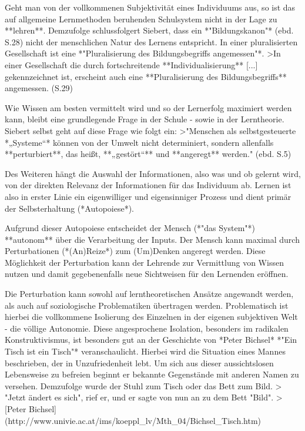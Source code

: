Geht man von der vollkommenen Subjektivität eines Individuums aus, so ist das auf allgemeine Lernmethoden beruhenden Schulsystem nicht in der Lage zu **lehren**.
Demzufolge schlussfolgert Siebert, dass ein *"Bildungskanon"* (ebd. S.28) nicht der menschlichen Natur des Lernens entspricht.
In einer pluralisierten Gesellschaft ist eine *"Pluralisierung des Bildungsbegriffs angemessen"*.
>In einer Gesellschaft die durch fortschreitende **Individualisierung** [...] gekennzeichnet ist, erscheint auch eine **Pluralisierung des Bildungsbegriffs** angemessen. (S.29)

Wie Wissen am besten vermittelt wird und so der Lernerfolg maximiert werden kann, bleibt eine grundlegende Frage in der Schule - sowie in der Lerntheorie.
Siebert selbst geht auf diese Frage wie folgt ein:
>"Menschen als selbstgesteuerte *„Systeme“* können von der Umwelt nicht determiniert, sondern allenfalls **perturbiert**, das heißt, **„gestört“** und **angeregt** werden." (ebd. S.5)

Des Weiteren hängt die Auswahl der Informationen, also was und ob gelernt wird, von der direkten Relevanz der Informationen für das Individuum ab.
Lernen ist also in erster Linie ein eigenwilliger und eigensinniger Prozess und dient primär der Selbsterhaltung (*Autopoiese*).

Aufgrund dieser Autopoiese entscheidet der Mensch (*"das System"*) **autonom** über die Verarbeitung der Inputs.
Der Mensch kann maximal durch Perturbationen (*(An)Reize*) zum (Um)Denken angeregt werden.
Diese Möglichkeit der Perturbation kann der Lehrende zur Vermittlung von Wissen nutzen und damit gegebenenfalls neue Sichtweisen für den Lernenden eröffnen.

Die Perturbation kann sowohl auf lerntheoretischen Ansätze angewandt werden, als auch auf soziologische Problematiken übertragen werden.
Problematisch ist hierbei die vollkommene Isolierung des Einzelnen in der eigenen subjektiven Welt - die völlige Autonomie.
Diese angesprochene Isolation, besonders im radikalen Konstruktivismus, ist besonders gut an der Geschichte von *Peter Bichsel* *"Ein Tisch ist ein Tisch"* veranschaulicht.
Hierbei wird die Situation eines Mannes beschrieben, der in Unzufriedenheit lebt.
Um sich aus dieser aussichtslosen Lebensweise zu befreien beginnt er bekannte Gegenstände mit anderen Namen zu versehen.
Demzufolge wurde der Stuhl zum Tisch oder das Bett zum Bild.
> "Jetzt ändert es sich", rief er, und er sagte von nun an zu dem Bett "Bild".
> [Peter Bichsel](http://www.univie.ac.at/ims/koeppl_lv/Mth_04/Bichsel_Tisch.htm)

